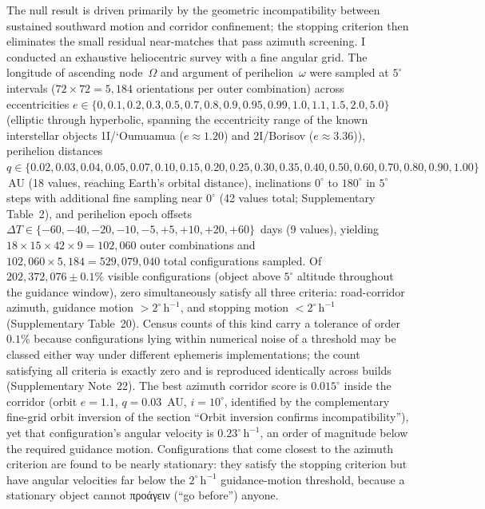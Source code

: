 \documentclass[sn-nature]{sn-jnl}
\newcommand{\grk}[1]{{\fontencoding{LGR}\selectfont #1}}
\newcommand{\grk}[1]{{\greekfont #1}}
\begin{document}
The null result is driven primarily by the geometric incompatibility between
sustained southward motion and corridor confinement; the stopping criterion
then eliminates the small residual near-matches that pass azimuth screening.
I conducted an exhaustive heliocentric survey with a fine angular grid.
The longitude of ascending node~$\Omega$ and argument of perihelion~$\omega$
were sampled at $5^\circ$ intervals ($72 \times 72 = 5{,}184$ orientations
per outer combination) across eccentricities
$e \in \{0, 0.1, 0.2, 0.3, 0.5, 0.7, 0.8, 0.9, 0.95, 0.99, 1.0, 1.1,
1.5, 2.0, 5.0\}$ (elliptic through hyperbolic, spanning the eccentricity
range of the known interstellar objects
1I/\textquoteleft{}Oumuamua ($e \approx 1.20$)\cite{meech2017} and
2I/Borisov ($e \approx 3.36$)\cite{guzik2020}), perihelion distances
$q \in \{0.02, 0.03, 0.04, 0.05, 0.07, 0.10, 0.15, 0.20, 0.25, 0.30,\allowbreak
0.35, 0.40, 0.50, 0.60, 0.70, 0.80, 0.90, 1.00\}$\,AU (18 values,
reaching Earth's orbital distance), inclinations $0^\circ$ to $180^\circ$
in $5^\circ$ steps with additional fine sampling near $0^\circ$
(42 values total; Supplementary Table~2), and perihelion epoch offsets
$\Delta T \in \{-60, -40, -20, -10, -5, +5, +10, +20, +60\}$~days (9
values), yielding $18 \times 15 \times 42 \times 9 = 102{,}060$ outer
combinations and $102{,}060 \times 5{,}184 = 529{,}079{,}040$ total
configurations sampled. Of $202{,}372{,}076 \pm 0.1\%$ visible configurations
(object above $5^\circ$ altitude throughout the guidance window), zero
simultaneously satisfy all three criteria: road-corridor azimuth,
guidance motion $> 2^\circ\,\mathrm{h}^{-1}$, and stopping motion
$< 2^\circ\,\mathrm{h}^{-1}$ (Supplementary Table~20).
Census counts of this kind carry a tolerance of order $0.1\%$ because
configurations lying within numerical noise of a threshold may be classed
either way under different ephemeris implementations; the count satisfying
all criteria is exactly zero and is reproduced identically across builds
(Supplementary Note~22).
The best azimuth corridor score is $0.015^\circ$ inside the corridor
(orbit $e=1.1$, $q=0.03$~AU, $i=10^\circ$, identified by the
complementary fine-grid orbit inversion of the section ``Orbit inversion confirms incompatibility''),
yet that configuration's angular velocity is $0.23^\circ\,\mathrm{h}^{-1}$, an
order of magnitude below the required guidance motion. Configurations that come closest to
the azimuth criterion are found to be nearly stationary: they satisfy the stopping
criterion but have angular velocities far below the
$2^\circ\,\mathrm{h}^{-1}$ guidance-motion threshold, because a
stationary object cannot \grk{προάγειν} (``go before'') anyone.
\end{document}
